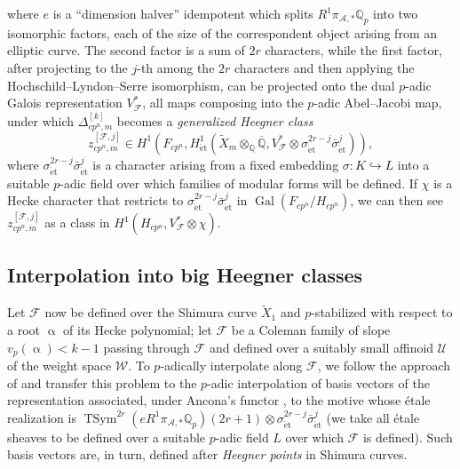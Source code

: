 \documentclass[a4paper]{amsart}
\numberwithin{equation}{section}
\theoremstyle{definition}
\newcommand{\Q}{\mathbb{Q}}
\DeclareMathOperator{\Gal}{Gal}
\DeclareMathOperator{\et}{\text{\'et}}
\DeclareMathOperator{\TSym}{TSym}
\renewcommand{\et}{\mathrm{\acute{e}t}}
\begin{document}
where $e$ is a ``dimension halver'' idempotent which splits $R^1\pi_{\mathcal{A},*}\Q_{p}$ into two isomorphic factors, each of the size of the correspondent object arising from an elliptic curve. The second factor is a sum of $2r$ characters, while the first factor, after projecting to the $j$-th among the $2r$ characters and then applying the Hochschild--Lyndon--Serre isomorphism, can be projected onto the dual $p$-adic Galois representation $V_{\mathcal{F}}^*$, all maps composing into the $p$-adic Abel--Jacobi map, under which $\Delta_{cp^n,m}^{[k]}$ becomes a \textit{generalized Heegner class} \[z_{cp^n,m}^{[\mathcal{F},j]}\in H^1\left(F_{cp^n},H^1_{\et}(\widetilde{X}_m\otimes_\Q\overline{\Q},V_{\mathcal{F}}^*\otimes\sigma_{\et}^{2r-j}\bar{\sigma}_{\et}^j)\right),\] where $\sigma_{\et}^{2r-j}\bar{\sigma}_{\et}^j$ is a character arising from a fixed embedding $\sigma\colon K\hookrightarrow L$ into a suitable $p$-adic field over which families of modular forms will be defined. If $\chi$ is a Hecke character that restricts to $\sigma_{\et}^{2r-j}\bar{\sigma}_{\et}^j$ in $\Gal(F_{cp^n}/H_{cp^n})$, we can then see $z_{cp^n,m}^{[\mathcal{F},j]}$ as a class in $H^1(H_{cp^n}, V_\mathcal{F}^*\otimes\chi)$.

\subsection{Interpolation into big Heegner classes} Let $\mathcal{F}$ now be defined over the Shimura curve $\widetilde{X}_1$ and $p$-stabilized with respect to a root $\upalpha$ of its Hecke polynomial; let $\mathscr{F}$ be a Coleman family of slope $v_p(\upalpha)<k-1$ passing through $\mathcal{F}$ and defined over a suitably small affinoid $\mathscr{U}$ of the weight space $\mathscr{W}$. To $p$-adically interpolate along $\mathscr{F}$, we follow the approach of \cite{JetchevLoefflerZerbes} and transfer this problem to the $p$-adic interpolation of basis vectors of the representation associated, under Ancona's functor \cite{Ancona}, to the motive whose étale realization is $\TSym^{2r}(eR^1\pi_{\mathcal{A},*}\Q_{p})(2r+1)\otimes\sigma_{\et}^{2r-j}\bar{\sigma}_{\et}^j$ (we take all étale sheaves to be defined over a suitable $p$-adic field $L$ over which $\mathscr{F}$ is defined). Such basis vectors are, in turn, defined after \textit{Heegner points} in Shimura curves.
\end{document}
